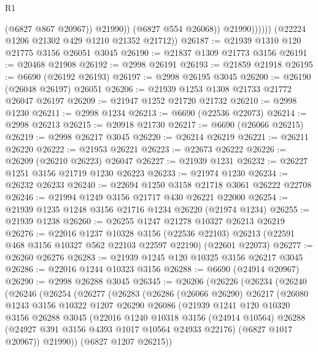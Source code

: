 \begin{lexlean}{R1}
\begin{coremodule}
                          (@6827 @867 @20967))
                        @21990))
                    (@6827 @554 @26068))
                  @21990))))))
      (@22224 @1206 @21302 @429 @1210 @21352 @21712))
@26187 := @21939 @1310 @120 @21775 @3156 @26051 @3045
@26190 := @21837 @1309 @21773 @3156
@26191 := @20468 @21908
@26192 := @2998 @26191
@26193 := @21859 @21918
@26195 := @6690 (@26192 @26193)
@26197 := @2998 @26195 @3045
@26200 := @26190 (@26048 @26197) @26051
@26206 := @21939 @1253 @1308 @21733 @21772 @26047 @26197
@26209 := @21947 @1252 @21720 @21732
@26210 := @2998 @1230
@26211 := @2998 @1234
@26213 := @6690 (@22536 @22073)
@26214 := @2998 @26213
@26215 := @20918 @21730
@26217 := @6690 (@26066 @26215)
@26219 := @2998 @26217 @3045
@26220 := @26214 @26219
@26221 := @26211 @26220
@26222 := @21953 @26221
@26223 := @22673 @26222
@26226 := @26209 (@26210 @26223) @26047
@26227 := @21939 @1231
@26232 := @26227 @1251 @3156 @21719 @1230 @26223
@26233 := @21974 @1230
@26234 := @26232 @26233
@26240 := @22694 @1250 @3158 @21718 @3061 @26222 @22708
@26246 := @21994 @1249 @3156 @21717 @430 @26221 @22000
@26254 := @21939 @1235 @1248 @3156 @21716 @1234 @26220 (@21974 @1234)
@26255 := @21939 @1238
@26260 := @26255 @1247 @21278 @10327 @26213 @26219
@26276 := @22016
    @1237
    @10328
    @3156
    (@22536 @22103)
    @26213
    (@22591 @468 @3156 @10327 @562 @22103 @22597 @22190)
    (@22601 @22073)
@26277 := @26260 @26276
@26283 := @21939 @1245 @120 @10325 @3156 @26217 @3045
@26286 := @22016 @1244 @10323 @3156
@26288 := @6690 (@24914 @20967)
@26290 := @2998 @26288 @3045
@26345 := @26206
    (@26226
      (@26234
        (@26240
          (@26246
            (@26254
              (@26277
                (@26283
                  (@26286
                    (@26066 @26290)
                    @26217
                    (@26080
                      @1243
                      @3156
                      @10322
                      @1207
                      @26290
                      @26086
                      (@21939
                        @1241
                        @120
                        @10320
                        @3156
                        @26288
                        @3045
                        (@22016
                          @1240
                          @10318
                          @3156
                          (@24914 @10564)
                          @26288
                          (@24927 @391 @3156 @4393 @1017 @10564 @24933 @22176)
                          (@6827 @1017 @20967))
                        @21990))
                    (@6827 @1207 @26215))

\end{coremodule}
\end{lexlean}
